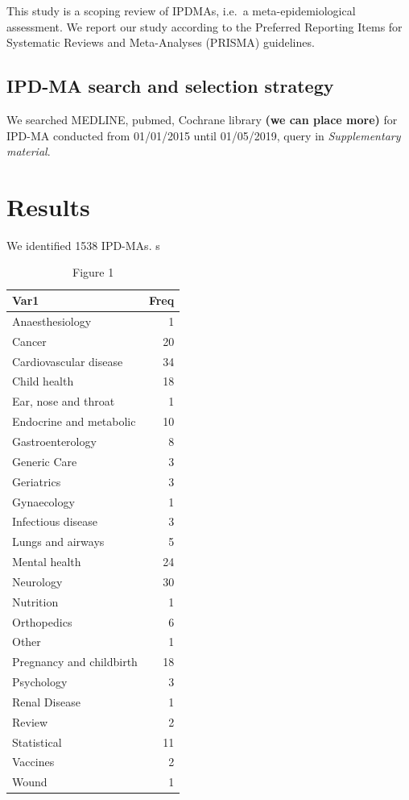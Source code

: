 \documentclass[]{article}
\begin{document}
This study is a scoping review of IPDMAs, i.e.~a meta-epidemiological
assessment. We report our study according to the Preferred Reporting
Items for Systematic Reviews and Meta-Analyses (PRISMA) guidelines.

\hypertarget{ipd-ma-search-and-selection-strategy}{%
\subsection{IPD-MA search and selection
strategy}\label{ipd-ma-search-and-selection-strategy}}

We searched MEDLINE, pubmed, Cochrane library \textbf{(we can place
more)} for IPD-MA conducted from 01/01/2015 until 01/05/2019, query in
\emph{Supplementary material}.

\newpage

\hypertarget{results-1}{%
\section{Results}\label{results-1}}

We identified 1538 IPD-MAs. s

\begin{table}[t]

\caption{\label{tab:unnamed-chunk-2}Figure 1}
\centering
\begin{tabular}{lr}
\toprule
Var1 & Freq\\
\midrule
Anaesthesiology & 1\\
Cancer & 20\\
Cardiovascular disease & 34\\
Child health & 18\\
Ear, nose and throat & 1\\
\addlinespace
Endocrine and metabolic & 10\\
Gastroenterology & 8\\
Generic Care & 3\\
Geriatrics & 3\\
Gynaecology & 1\\
\addlinespace
Infectious disease & 3\\
Lungs and airways & 5\\
Mental health & 24\\
Neurology & 30\\
Nutrition & 1\\
\addlinespace
Orthopedics & 6\\
Other & 1\\
Pregnancy and childbirth & 18\\
Psychology & 3\\
Renal Disease & 1\\
\addlinespace
Review & 2\\
Statistical & 11\\
Vaccines & 2\\
Wound & 1\\
\bottomrule
\end{tabular}
\end{table}
\end{document}
